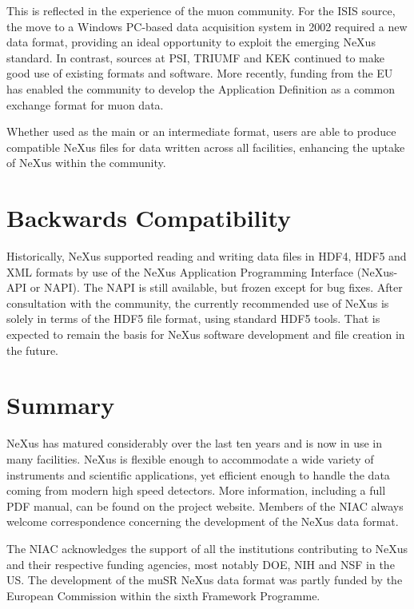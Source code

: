 \documentclass[%
 aip,
rsi,
 amsmath,amssymb,
 reprint,%
]{revtex4-1}
\begin{document}
This is reflected in the experience of the muon community. For the ISIS source, the move to a Windows PC-based data acquisition 
system in 2002 required a new data format, providing an ideal opportunity to exploit the emerging NeXus standard\cite{muon1}. In 
contrast, sources at PSI, TRIUMF and KEK continued to make good use of existing formats and software. More recently, funding 
from the EU has enabled the community to develop the Application Definition as a common exchange format for muon data\cite{muon2}. 

Whether used as the main or an intermediate format, users are able to produce compatible NeXus files for data written 
across all facilities, enhancing the uptake of NeXus within the community.


\section{Backwards Compatibility}

Historically, NeXus supported reading and writing data files in HDF4, HDF5 and
XML formats by use of the NeXus Application Programming Interface
(NeXus-API or NAPI).  The NAPI is still available, but frozen except for bug fixes.
After consultation with the community, the currently recommended use of
NeXus is solely in terms of the HDF5 file format, using standard HDF5 tools.
That is expected to remain the basis for NeXus software development and
file creation in the future.

\section{Summary}

NeXus has matured considerably over the last ten years and is now in use in many facilities. NeXus 
is flexible enough to accommodate a wide variety of instruments and scientific applications,
yet efficient enough to handle the data coming from modern high speed detectors.
More information, including a full PDF manual, can be found on the project 
website\cite{nxwww}.  Members of the NIAC\cite{niac}
always welcome correspondence concerning the development of the NeXus data format.

\begin{acknowledgments}
The NIAC acknowledges the support of all the institutions contributing to NeXus and their respective 
funding agencies, most notably DOE, NIH and NSF in the US. The development of the muSR NeXus data format was partly 
funded by the European Commission within the sixth Framework Programme. 
\end{acknowledgments}

\nocite{*}
\end{document}
